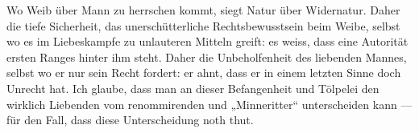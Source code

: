 Wo Weib über Mann zu herrschen kommt, siegt Natur über Widernatur. Daher die tiefe Sicherheit, das unerschütterliche Rechtsbewusstsein beim Weibe, selbst wo es im Liebeskampfe zu unlauteren Mitteln greift: es weiss, dass eine Autorität ersten Ranges hinter ihm steht. Daher die Unbeholfenheit des liebenden Mannes, selbst wo er nur sein Recht fordert: er ahnt, dass er in einem letzten Sinne doch Unrecht hat. Ich glaube, dass man an dieser Befangenheit und Tölpelei den wirklich Liebenden vom renommirenden  und „Minneritter“ unterscheiden kann — für den Fall, dass diese Unterscheidung noth thut.
\par


